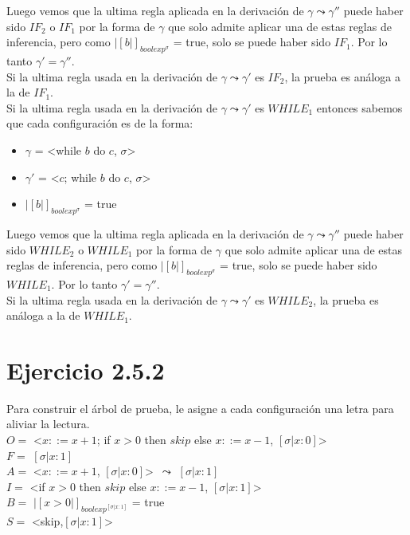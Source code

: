 \documentclass[a4paper,12pt]{article}
\begin{document}
Luego vemos que la ultima regla aplicada en la derivación de $\gamma \leadsto \gamma''$ 
puede haber sido $IF_{2}$ o $IF_{1}$ por la forma de $\gamma$ que solo admite 
aplicar una de estas reglas de inferencia, pero como $|[b|]_{boolexp^{\sigma}}$ = true, solo 
se puede haber sido $IF_{1}$. Por lo tanto $\gamma' = \gamma''$.\\

Si la ultima regla usada en la derivación de $\gamma \leadsto \gamma'$ es $IF_{2}$, la prueba es 
análoga a la  de $IF_{1}$.\\


Si la ultima regla usada en la derivación de $\gamma \leadsto \gamma'$ es $WHILE_{1}$ entonces 
sabemos que cada configuración es de la forma:

\begin{itemize}
  \item $\gamma$ = \textless while $b$ do $c$, $\sigma$\textgreater
  \item $\gamma'$ = \textless $c$; while $b$ do $c$, $\sigma$\textgreater 
  \item $|[b|]_{boolexp^{\sigma}}$ = true 
\end{itemize}

Luego vemos que la ultima regla aplicada en la derivación de $\gamma \leadsto \gamma''$ 
puede haber sido $WHILE_{2}$ o $WHILE_{1}$ por la forma de $\gamma$ que solo admite 
aplicar una de estas reglas de inferencia, pero como $|[b|]_{boolexp^{\sigma}}$ = true, solo 
se puede haber sido $WHILE_{1}$. Por lo tanto $\gamma' = \gamma''$.\\

Si la ultima regla usada en la derivación de $\gamma \leadsto \gamma'$ es $WHILE_{2}$, la prueba es 
análoga a la  de $WHILE_{1}$.\\


\newpage
\section{Ejercicio 2.5.2}

Para construir el árbol de prueba, le asigne a cada configuración una letra para aliviar la lectura.\\

\noindent $O =$ \textless $x ::= x+1$; if $x > 0$ then $skip$ else $x ::= x-1$, $[\sigma|x:0]$\textgreater\\
$F =$ $[\sigma|x:1]$\\
$A =$  \textless $x::= x+1$, $[\sigma|x:0]$\textgreater\ $\leadsto$ $[\sigma|x:1]$\\
$I =$ \textless if $x > 0$ then $skip$ else $x ::= x-1$, $[\sigma|x:1]$\textgreater\\
$B =$ $|[x > 0|]_{boolexp^{[\sigma|x:1]}}$ = true\\
$S =$ \textless skip,$[\sigma|x:1]$\textgreater\\
\end{document}
